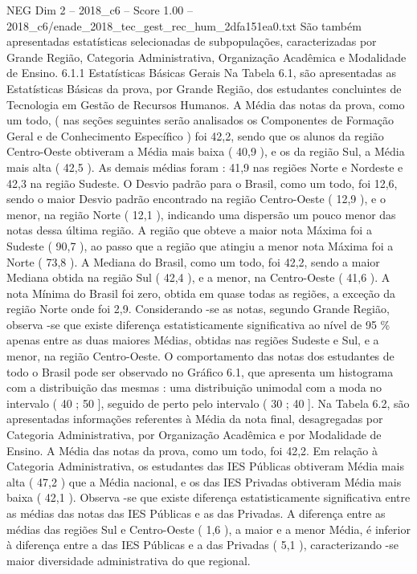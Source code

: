 \begin{textsample}{NEG Dim 2 – 2018\_c6 – Score 1.00 – 2018\_c6/enade\_2018\_tec\_gest\_rec\_hum\_2dfa151ea0.txt}
São também apresentadas estatísticas selecionadas de subpopulações, caracterizadas por Grande Região, Categoria Administrativa, Organização Acadêmica e Modalidade de Ensino. 6.1.1 Estatísticas Básicas Gerais Na Tabela 6.1, são apresentadas as Estatísticas Básicas da prova, por Grande Região, dos estudantes concluintes de Tecnologia em Gestão de Recursos Humanos.
A Média das notas da prova, como um todo, ( nas seções seguintes serão analisados os Componentes de Formação Geral e de Conhecimento Específico ) foi 42,2, sendo que os alunos da região Centro-Oeste obtiveram a Média mais baixa ( 40,9 ), e os da região Sul, a Média mais alta ( 42,5 ).
As demais médias foram : 41,9 nas regiões Norte e Nordeste e 42,3 na região Sudeste.
O Desvio padrão para o Brasil, como um todo, foi 12,6, sendo o maior Desvio padrão encontrado na região Centro-Oeste ( 12,9 ), e o menor, na região Norte ( 12,1 ), indicando uma dispersão um pouco menor das notas dessa última região.
A região que obteve a maior nota Máxima foi a Sudeste ( 90,7 ), ao passo que a região que atingiu a menor nota Máxima foi a Norte ( 73,8 ).
A Mediana do Brasil, como um todo, foi 42,2, sendo a maior Mediana obtida na região Sul ( 42,4 ), e a menor, na Centro-Oeste ( 41,6 ).
A nota Mínima do Brasil foi zero, obtida em quase todas as regiões, a exceção da região Norte onde foi 2,9.
Considerando -se as notas, segundo Grande Região, observa -se que existe diferença estatisticamente significativa ao nível de 95 \% apenas entre as duas maiores Médias, obtidas nas regiões Sudeste e Sul, e a menor, na região Centro-Oeste.
O comportamento das notas dos estudantes de todo o Brasil pode ser observado no Gráfico 6.1, que apresenta um histograma com a distribuição das mesmas : uma distribuição unimodal com a moda no intervalo ( 40 ; 50 ], seguido de perto pelo intervalo ( 30 ; 40 ].
Na Tabela 6.2, são apresentadas informações referentes à Média da nota final, desagregadas por Categoria Administrativa, por Organização Acadêmica e por Modalidade de Ensino.
A Média das notas da prova, como um todo, foi 42,2.
Em relação à Categoria Administrativa, os estudantes das IES Públicas obtiveram Média mais alta ( 47,2 ) que a Média nacional, e os das IES Privadas obtiveram Média mais baixa ( 42,1 ).
Observa -se que existe diferença estatisticamente significativa entre as médias das notas das IES Públicas e as das Privadas.
A diferença entre as médias das regiões Sul e Centro-Oeste ( 1,6 ), a maior e a menor Média, é inferior à diferença entre a das IES Públicas e a das Privadas ( 5,1 ), caracterizando -se maior diversidade administrativa do que regional.

\end{textsample}
